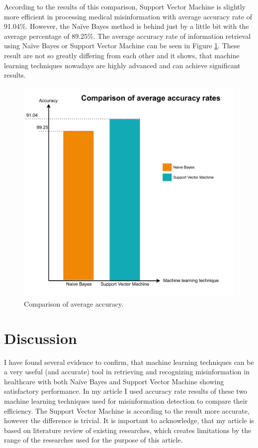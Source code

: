 \documentclass[11pt ,english,a4paper]{article}
\begin{document}
According to the results of this comparison, Support Vector Machine is slightly more efficient in processing medical misinformation with average accuracy rate of 91.04\%. However, the Naïve Bayes method is behind just by a little bit with the average percentage of 89.25\%. The average accuracy rate of information retrieval using Naïve Bayes or Support Vector Machine can be seen in Figure \ref{f:average}. These result are not so greatly differing from each other and it shows, that machine learning techniques nowadays are highly advanced and can achieve significant results.

\begin{figure}[H]
\centering
\includegraphics[scale=0.4]{average_accuracy.pdf}
\caption{\centering Comparison of average accuracy.}
\label{f:average}
\end{figure}

\section{Discussion}

I have found several evidence to confirm, that machine learning techniques can be a very useful (and accurate) tool in retrieving and recognizing misinformation in healthcare with both Naïve Bayes and Support Vector Machine showing satisfactory performance. In my article I used accuracy rate results of these two machine learning techniques used for misinformation detection to compare their efficiency. The Support Vector Machine is according to the result more accurate, however the difference is trivial. It is important to acknowledge, that my article is based on literature review of existing researches, which creates limitations by the range of the researches used for the purpose of this article.
\end{document}
